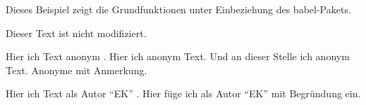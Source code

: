 \documentclass[ngerman]{article}
\begin{document}
	Dieses Beispiel zeigt die Grundfunktionen	unter Einbeziehung des babel-Pakets.

	\listofchanges

	Dieser Text ist nicht modifiziert.

	Hier  ich Text anonym .
	Hier  ich anonym Text.
	Und an dieser Stelle  ich anonym Text.
	Anonyme  mit Anmerkung.

	Hier  ich Text als Autor "`EK"' .
	Hier füge ich 	als Autor "`EK"' mit Begründung ein.
\end{document}
